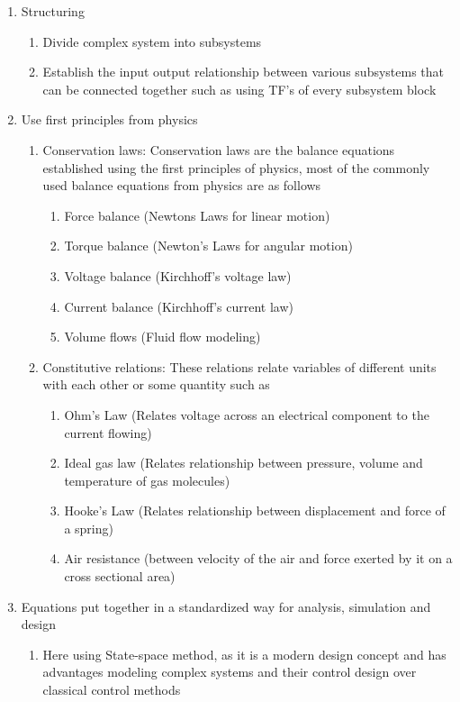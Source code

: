 \begin{enumerate}
	\item Structuring
	\begin{enumerate}
		\item Divide complex system into subsystems
		\item Establish the input output relationship between various subsystems that can be connected together such as using TF's of every subsystem block
	\end{enumerate}
	\item Use first principles from physics
	\begin{enumerate}
		\item Conservation laws: Conservation laws are the balance equations established using the first principles of physics, most of the commonly used balance equations from physics are as follows
		\begin{enumerate}
			\item Force balance (Newtons Laws for linear motion)
			\item Torque balance (Newton's Laws for angular motion)
			\item Voltage balance (Kirchhoff's voltage law)
			\item Current balance (Kirchhoff's current law)
			\item Volume flows (Fluid flow modeling)
		\end{enumerate}
		\item Constitutive relations: These relations relate variables of different units with each other or some quantity such as
		\begin{enumerate}
			\item Ohm's Law (Relates voltage across an electrical component to the current flowing)
			\item Ideal gas law (Relates relationship between pressure, volume and temperature of gas molecules)
			\item Hooke's Law (Relates relationship between displacement and force of a spring)
			\item Air resistance (between velocity of the air and force exerted by it on a cross sectional area)
		\end{enumerate}
	\end{enumerate}
	\item Equations put together in a standardized way for analysis, simulation and design
	\begin{enumerate}
		\item Here using State-space method, as it is a modern design concept and has advantages modeling complex systems and their control design over classical control methods

\end{enumerate}
\end{enumerate}
